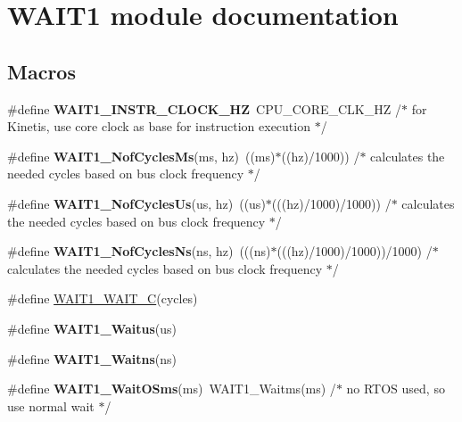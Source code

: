 \hypertarget{group___w_a_i_t1__module}{\section{W\-A\-I\-T1 module documentation}
\label{group___w_a_i_t1__module}
}
\subsection*{Macros}
\begin{DoxyCompactItemize}
\item 
\hypertarget{group___w_a_i_t1__module_gad719b8589ad1bf92a03ec94ce95c4804}{\#define {\bfseries W\-A\-I\-T1\-\_\-\-I\-N\-S\-T\-R\-\_\-\-C\-L\-O\-C\-K\-\_\-\-H\-Z}~C\-P\-U\-\_\-\-C\-O\-R\-E\-\_\-\-C\-L\-K\-\_\-\-H\-Z /$\ast$ for Kinetis, use core clock as base for instruction execution $\ast$/}\label{group___w_a_i_t1__module_gad719b8589ad1bf92a03ec94ce95c4804}

\item 
\hypertarget{group___w_a_i_t1__module_ga7e74874c42a8979fb279fc86d373b60a}{\#define {\bfseries W\-A\-I\-T1\-\_\-\-Nof\-Cycles\-Ms}(ms, hz)~((ms)$\ast$((hz)/1000)) /$\ast$ calculates the needed cycles based on bus clock frequency $\ast$/}\label{group___w_a_i_t1__module_ga7e74874c42a8979fb279fc86d373b60a}

\item 
\hypertarget{group___w_a_i_t1__module_ga7dabbdd9744304c62df945607fa13dcf}{\#define {\bfseries W\-A\-I\-T1\-\_\-\-Nof\-Cycles\-Us}(us, hz)~((us)$\ast$(((hz)/1000)/1000)) /$\ast$ calculates the needed cycles based on bus clock frequency $\ast$/}\label{group___w_a_i_t1__module_ga7dabbdd9744304c62df945607fa13dcf}

\item 
\hypertarget{group___w_a_i_t1__module_gaca73593e1131b4845062bd9ec4ee5cac}{\#define {\bfseries W\-A\-I\-T1\-\_\-\-Nof\-Cycles\-Ns}(ns, hz)~(((ns)$\ast$(((hz)/1000)/1000))/1000) /$\ast$ calculates the needed cycles based on bus clock frequency $\ast$/}\label{group___w_a_i_t1__module_gaca73593e1131b4845062bd9ec4ee5cac}

\item 
\#define \hyperlink{group___w_a_i_t1__module_ga9824395bc44b736ec5b29dd219ef8418}{W\-A\-I\-T1\-\_\-\-W\-A\-I\-T\-\_\-\-C}(cycles)
\item 
\#define {\bfseries W\-A\-I\-T1\-\_\-\-Waitus}(us)
\item 
\#define {\bfseries W\-A\-I\-T1\-\_\-\-Waitns}(ns)
\item 
\hypertarget{group___w_a_i_t1__module_ga2691150b572fe622d361fb48539af70e}{\#define {\bfseries W\-A\-I\-T1\-\_\-\-Wait\-O\-Sms}(ms)~W\-A\-I\-T1\-\_\-\-Waitms(ms) /$\ast$ no R\-T\-O\-S used, so use normal wait $\ast$/}\label{group___w_a_i_t1__module_ga2691150b572fe622d361fb48539af70e}

\end{DoxyCompactItemize}
